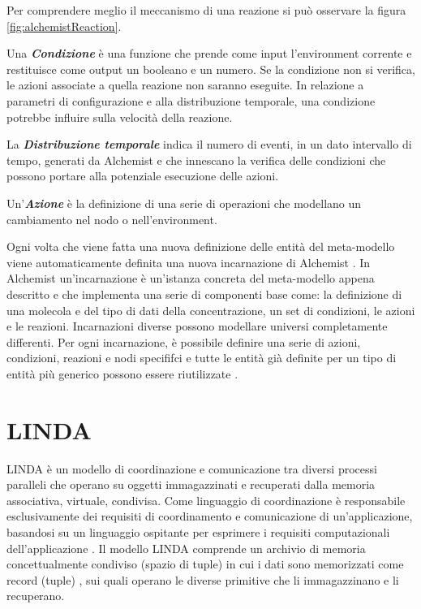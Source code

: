 Per comprendere meglio il meccanismo di una reazione si può osservare la figura \ref{fig:alchemistReaction}.

Una \textbf{\textit{Condizione}} è una funzione che prende come input l'environment corrente e restituisce come output un booleano e un numero. Se la condizione non si verifica, le azioni associate a quella reazione non saranno eseguite. In relazione a parametri di configurazione e alla distribuzione temporale, una condizione potrebbe influire sulla velocità della reazione.

La \textbf{\textit{Distribuzione temporale}} indica il numero di eventi, in un dato intervallo di tempo, generati da Alchemist e che innescano la verifica delle condizioni che possono portare alla potenziale esecuzione delle azioni.

Un'\textbf{\textit{Azione}} è la definizione di una serie di operazioni che modellano un cambiamento nel nodo o nell'environment.

Ogni volta che viene fatta una nuova definizione delle entità del meta-modello viene automaticamente definita una nuova incarnazione di Alchemist \cite{alchemist-jos2013}.
In Alchemist un'incarnazione è un'istanza concreta del meta-modello appena descritto e che implementa una serie di componenti base come: la definizione di una molecola e del tipo di dati della concentrazione, un set di condizioni, le azioni e le reazioni. Incarnazioni diverse possono modellare universi completamente differenti.
Per ogni incarnazione, è possibile definire una serie di azioni, condizioni, reazioni e nodi specififci e tutte le entità già definite per un tipo di entità più generico possono essere riutilizzate \cite{alchemist-jos2013}.

\section{LINDA}
LINDA è un modello di coordinazione e comunicazione tra diversi processi paralleli che operano su oggetti immagazzinati e recuperati dalla memoria associativa, virtuale, condivisa.
Come linguaggio di coordinazione è responsabile esclusivamente dei requisiti di coordinamento e comunicazione di un'applicazione, basandosi su un linguaggio ospitante per esprimere i requisiti computazionali dell'applicazione \cite{coord-language-linda}.
Il modello LINDA comprende un archivio di memoria concettualmente condiviso (spazio di tuple) in cui i dati sono memorizzati come record (tuple) \cite{coord-language-linda}, sui quali operano le diverse primitive che li immagazzinano e li recuperano.

